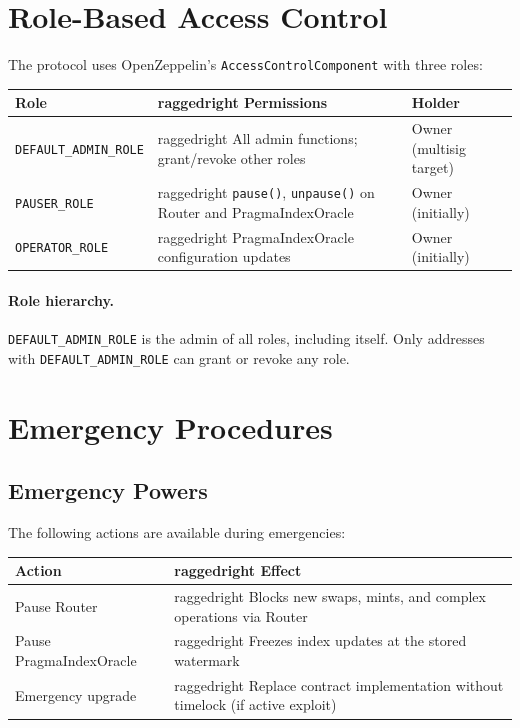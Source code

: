 \section{Role-Based Access Control}

The protocol uses OpenZeppelin's \texttt{AccessControlComponent} with three roles:

\begin{center}
\begin{tabularx}{\textwidth}{l >{raggedright\arraybackslash}X l}
\toprule
\textbf{Role} & \textbf{Permissions} & \textbf{Holder} \\
\midrule
\texttt{DEFAULT\_ADMIN\_ROLE} & All admin functions; grant/revoke other roles & Owner (multisig target) \\
\texttt{PAUSER\_ROLE} & \texttt{pause()}, \texttt{unpause()} on Router and PragmaIndexOracle & Owner (initially) \\
\texttt{OPERATOR\_ROLE} & PragmaIndexOracle configuration updates & Owner (initially) \\
\bottomrule
\end{tabularx}
\end{center}

\paragraph{Role hierarchy.}
\texttt{DEFAULT\_ADMIN\_ROLE} is the admin of all roles, including itself. Only addresses with \texttt{DEFAULT\_ADMIN\_ROLE} can grant or revoke any role.


\section{Emergency Procedures}

\subsection{Emergency Powers}

The following actions are available during emergencies:

\begin{center}
\begin{tabularx}{\textwidth}{l >{raggedright\arraybackslash}X}
\toprule
\textbf{Action} & \textbf{Effect} \\
\midrule
Pause Router & Blocks new swaps, mints, and complex operations via Router \\
Pause PragmaIndexOracle & Freezes index updates at the stored watermark \\
Emergency upgrade & Replace contract implementation without timelock (if active exploit) \\
\bottomrule
\end{tabularx}
\end{center}

